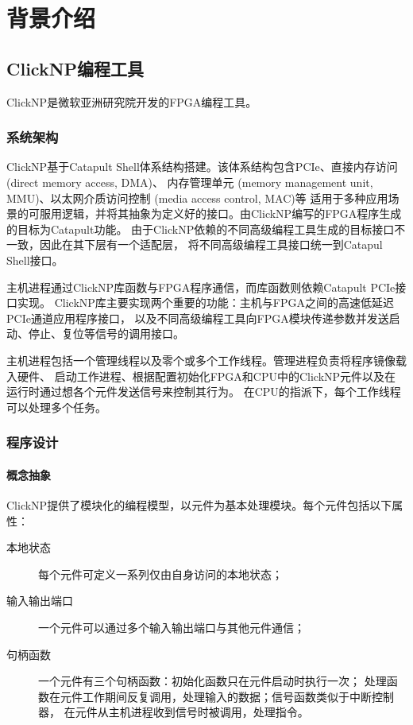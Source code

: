 \chapter{背景介绍}
\section{ClickNP编程工具}
ClickNP是微软亚洲研究院开发的FPGA编程工具\cite{clicknp}。
\subsection{系统架构}
ClickNP基于Catapult Shell体系结构\cite{6853195}搭建。该体系结构包含PCIe、直接内存访问 (direct memory access, DMA)、
内存管理单元 (memory management unit, MMU)、以太网介质访问控制 (media access control, MAC)等
适用于多种应用场景的可服用逻辑，并将其抽象为定义好的接口。由ClickNP编写的FPGA程序生成的目标为Catapult功能。
由于ClickNP依赖的不同高级编程工具生成的目标接口不一致，因此在其下层有一个适配层，
将不同高级编程工具接口统一到Catapul Shell接口。

主机进程通过ClickNP库函数与FPGA程序通信，而库函数则依赖Catapult PCIe接口实现。
ClickNP库主要实现两个重要的功能：主机与FPGA之间的高速低延迟PCIe通道应用程序接口，
以及不同高级编程工具向FPGA模块传递参数并发送启动、停止、复位等信号的调用接口。

主机进程包括一个管理线程以及零个或多个工作线程。管理进程负责将程序镜像载入硬件、
启动工作进程、根据配置初始化FPGA和CPU中的ClickNP元件以及在运行时通过想各个元件发送信号来控制其行为。
在CPU的指派下，每个工作线程可以处理多个任务。

\subsection{程序设计}
\subsubsection{概念抽象}
ClickNP提供了模块化的编程模型，以元件为基本处理模块。每个元件包括以下属性：
\begin{description}
\item[本地状态]每个元件可定义一系列仅由自身访问的本地状态；
\item[输入输出端口]一个元件可以通过多个输入输出端口与其他元件通信；
\item[句柄函数]一个元件有三个句柄函数：初始化函数只在元件启动时执行一次；
处理函数在元件工作期间反复调用，处理输入的数据；信号函数类似于中断控制器，
在元件从主机进程收到信号时被调用，处理指令。
\end{description}

